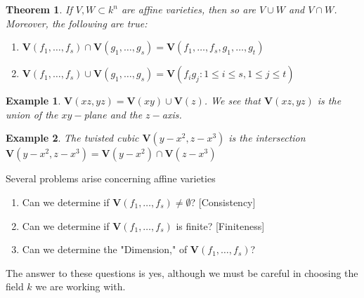 \documentclass[oneside]{book}
\theoremstyle{mystyle}
\newtheorem{theorem}{Theorem}[section]
\newtheorem{example}{Example}[section]
\begin{document}
\begin{theorem}
If $V,W\subset k^n$ are affine varieties, then so are $V\cup W$ and $V\cap W$. Moreover, the following are true:
\begin{enumerate}
    \item $\mathbf{V}(f_1,\hdots, f_s) \cap \mathbf{V}(g_1,\hdots, g_s) = \mathbf{V}(f_1,\hdots, f_s,g_1,\hdots, g_t)$
    \item $\mathbf{V}(f_1,\hdots, f_s) \cup \mathbf{V}(g_1,\hdots, g_s) = \mathbf{V}(f_i g_j: 1\leq i \leq s, 1\leq j\leq t)$
\end{enumerate}
\end{theorem}
\begin{example}
$\mathbf{V}(xz,yz) = \mathbf{V}(xy)\cup \mathbf{V}(z)$. We see that $\mathbf{V}(xz,yz)$ is the union of the $xy-$plane and the $z-$axis.
\end{example}
\begin{example}
The twisted cubic $\mathbf{V}(y-x^2,z-x^3)$ is the intersection $\mathbf{V}(y-x^2,z-x^3) = \mathbf{V}(y-x^2)\cap \mathbf{V}(z-x^3)$
\end{example}
Several problems arise concerning affine varieties
\begin{enumerate}
    \item Can we determine if $\mathbf{V}(f_1,\hdots, f_s) \ne \emptyset$? \hfill [Consistency]
    \item Can we determine if $\mathbf{V}(f_1,\hdots, f_s)$ is finite? \hfill [Finiteness]
    \item Can we determine the "Dimension," of $\mathbf{V}(f_1,\hdots, f_s)$?
\end{enumerate}
The answer to these questions is yes, although we must be careful in choosing the field $k$ we are working with. 
\end{document}
